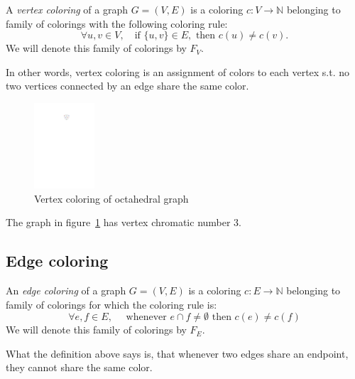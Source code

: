 \begin{definition}
    A \textit{vertex coloring} of a graph $G=(V,E)$ is a coloring $c : V \rightarrow \mathbb{N}$ belonging to family of colorings with the following coloring rule:
    \begin{equation}\label{eqn:vtx_rule}
        \forall u,v \in V, \quad \text{if } \{u,v\} \in E, \text{ then } c(u) \neq c(v). 
        \tag{$R_V$}
    \end{equation}
    We will denote this family of colorings by $F_V$.
\end{definition}

In other words, vertex coloring is an assignment of colors to each vertex s.t. no two vertices connected by an edge share the same color.

\begin{figure}[H]
    \centering
    \includegraphics[width=0.2\textwidth]{../Resources/Figs/octahedral_vtx_colr.pdf}
    \caption{Vertex coloring of octahedral graph}
    \label{fig:octahedral_vtx_coloring}
\end{figure}

The graph in figure~\ref{fig:octahedral_vtx_coloring} has vertex chromatic number 3.

\subsection{Edge coloring}

\begin{definition}
    An \textit{edge coloring} of a graph $G=(V,E)$ is a coloring $c: E \rightarrow \mathbb{N}$ belonging to family of colorings for which the coloring rule is: 
    \begin{equation}\label{eqn:edge_rule}
     \forall e,f \in E, \quad \text{ whenever } e \cap f \neq \emptyset \text{ then } c(e) \neq c(f) \tag{$R_E$}
    \end{equation}
    We will denote this family of colorings by $F_E$.
   
\end{definition}

What the definition above says is, that whenever two edges share an endpoint, they cannot share the same color. 


